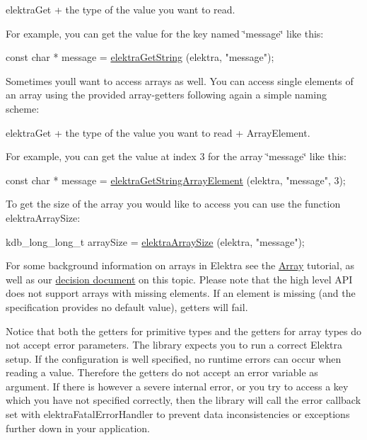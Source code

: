 {\ttfamily elektra\+Get} + the type of the value you want to read.

For example, you can get the value for the key named \char`\"{}message\char`\"{} like this\+:


\begin{DoxyCode}
\textcolor{keyword}{const} \textcolor{keywordtype}{char} * message = \hyperlink{group__highlevel_ga08df058ca39c5ac17c26924d301bb742}{elektraGetString} (elektra, \textcolor{stringliteral}{"message"});
\end{DoxyCode}


Sometimes you\textquotesingle{}ll want to access arrays as well. You can access single elements of an array using the provided array-\/getters following again a simple naming scheme\+:

{\ttfamily elektra\+Get} + the type of the value you want to read + {\ttfamily Array\+Element}.

For example, you can get the value at index 3 for the array \char`\"{}message\char`\"{} like this\+:


\begin{DoxyCode}
\textcolor{keyword}{const} \textcolor{keywordtype}{char} * message = \hyperlink{group__highlevel_gaf445216facccfc7ad6740b594e7a8f6e}{elektraGetStringArrayElement} (elektra, \textcolor{stringliteral}{"message"}, 3);
\end{DoxyCode}


To get the size of the array you would like to access you can use the function {\ttfamily elektra\+Array\+Size}\+:


\begin{DoxyCode}
kdb\_long\_long\_t arraySize = \hyperlink{group__highlevel_gaf0413286c6faebdc951b739924111909}{elektraArraySize} (elektra, \textcolor{stringliteral}{"message"});
\end{DoxyCode}


For some background information on arrays in Elektra see the \hyperlink{doc_tutorials_arrays_md}{Array} tutorial, as well as our \hyperlink{doc_decisions_array_md}{decision document} on this topic. Please note that the high level A\+PI does not support arrays with missing elements. If an element is missing (and the specification provides no default value), getters will fail.

Notice that both the getters for primitive types and the getters for array types do not accept error parameters. The library expects you to run a correct Elektra setup. If the configuration is well specified, no runtime errors can occur when reading a value. Therefore the getters do not accept an error variable as argument. If there is however a severe internal error, or you try to access a key which you have not specified correctly, then the library will call the error callback set with {\ttfamily elektra\+Fatal\+Error\+Handler} to prevent data inconsistencies or exceptions further down in your application.

